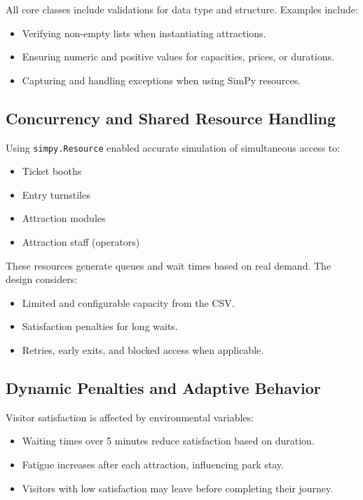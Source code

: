 \documentclass[12pt]{article}
\begin{document}
All core classes include validations for data type and structure. Examples include:
\begin{itemize}
    \item Verifying non-empty lists when instantiating attractions.
    \item Ensuring numeric and positive values for capacities, prices, or durations.
    \item Capturing and handling exceptions when using SimPy resources.
\end{itemize}

\subsection{Concurrency and Shared Resource Handling}

Using \texttt{simpy.Resource} enabled accurate simulation of simultaneous access to:
\begin{itemize}
    \item Ticket booths
    \item Entry turnstiles
    \item Attraction modules
    \item Attraction staff (operators)
\end{itemize}

These resources generate queues and wait times based on real demand. The design considers:
\begin{itemize}
    \item Limited and configurable capacity from the CSV.
    \item Satisfaction penalties for long waits.
    \item Retries, early exits, and blocked access when applicable.
\end{itemize}

\subsection{Dynamic Penalties and Adaptive Behavior}

Visitor satisfaction is affected by environmental variables:
\begin{itemize}
    \item Waiting times over 5 minutes reduce satisfaction based on duration.
    \item Fatigue increases after each attraction, influencing park stay.
    \item Visitors with low satisfaction may leave before completing their journey.
\end{itemize}
\end{document}
